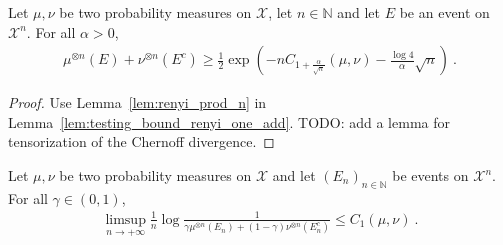 \begin{lemma}
  \label{lem:testing_bound_renyi_one_add_n}
  Let $\mu, \nu$ be two probability measures on $\mathcal X$, let $n \in \mathbb{N}$ and let $E$ be an event on $\mathcal X^n$. For all $\alpha > 0$,
  \begin{align*}
  \mu^{\otimes n}(E) + \nu^{\otimes n}(E^c) \ge \frac{1}{2}\exp\left( - n C_{1+\frac{\alpha}{\sqrt{n}}}(\mu, \nu) - \frac{\log 4}{\alpha}\sqrt{n}\right) \: .
  \end{align*}
\end{lemma}

\begin{proof}
Use Lemma~\ref{lem:renyi_prod_n} in Lemma~\ref{lem:testing_bound_renyi_one_add}. TODO: add a lemma for tensorization of the Chernoff divergence.
\end{proof}

\begin{theorem}
  \label{thm:testing_bound_chernoff}
  Let $\mu, \nu$ be two probability measures on $\mathcal X$ and let $(E_n)_{n \in \mathbb{N}}$ be events on $\mathcal X^n$. For all $\gamma \in (0,1)$,
  \begin{align*}
  \limsup_{n \to +\infty} \frac{1}{n}\log \frac{1}{\gamma \mu^{\otimes n}(E_n) + (1 - \gamma)\nu^{\otimes n}(E_n^c)}
  \le C_1(\mu, \nu)
  \: .
  \end{align*}
\end{theorem}

